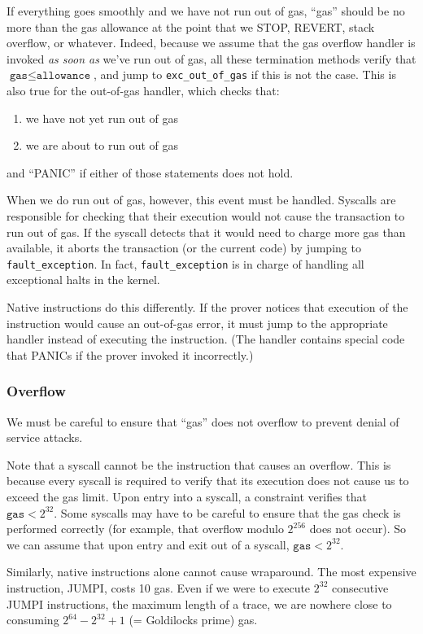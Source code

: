 If everything goes smoothly and we have not run out of gas, ``gas'' should be no more than the gas allowance at the point that we STOP, REVERT, stack overflow, or whatever. Indeed, because we assume that the gas overflow handler is invoked \textit{as soon as} we've run out of gas, all these termination methods verify that $\texttt{gas} \leq \texttt{allowance}$, and jump to \texttt{exc\_out\_of\_gas} if this is not the case. This is also true for the out-of-gas handler, which checks that: 
\begin{enumerate}
  \item we have not yet run out of gas
  \item we are about to run out of gas
\end{enumerate} 
and ``PANIC'' if either of those statements does not hold.

When we do run out of gas, however, this event must be handled. Syscalls are responsible for checking that their execution would not cause the transaction to run out of gas. If the syscall detects that it would need to charge more gas than available, it aborts the transaction (or the current code) by jumping to \texttt{fault\_exception}. In fact, \texttt{fault\_exception} is in charge of handling all exceptional halts in the kernel.

Native instructions do this differently. If the prover notices that execution of the instruction would cause an out-of-gas error, it must jump to the appropriate handler instead of executing the instruction. (The handler contains special code that PANICs if the prover invoked it incorrectly.)

\subsubsection{Overflow}

We must be careful to ensure that ``gas'' does not overflow to prevent denial of service attacks.

Note that a syscall cannot be the instruction that causes an overflow. This is because every syscall is required to verify that its execution does not cause us to exceed the gas limit. Upon entry into a syscall, a constraint verifies that $\texttt{gas} < 2^{32}$. Some syscalls may have to be careful to ensure that the gas check is performed correctly (for example, that overflow modulo $2^{256}$ does not occur). So we can assume that upon entry and exit out of a syscall, $\texttt{gas} < 2^{32}$.

Similarly, native instructions alone cannot cause wraparound. The most expensive instruction, JUMPI, costs 10 gas. Even if we were to execute $2^{32}$ consecutive JUMPI instructions, the maximum length of a trace, we are nowhere close to consuming $2^{64} - 2^{32} + 1$ (= Goldilocks prime) gas.

